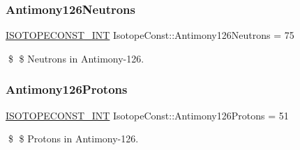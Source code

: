 \subsubsection{\texorpdfstring{Antimony126\+Neutrons}{Antimony126Neutrons}}
{\footnotesize\ttfamily \mbox{\hyperlink{group___isotope_const-_macros_ga5f18360b3e99483a35c32d789e62621c}{I\+S\+O\+T\+O\+P\+E\+C\+O\+N\+S\+T\+\_\+\+I\+NT}} Isotope\+Const\+::\+Antimony126\+Neutrons = 75}

\$ \$ Neutrons in Antimony-\/126. \mbox{\label{group___isotope_const-_antimony-_sb126_gaa0b935f35826832d19cf68b9bb60d9fb}} 
\subsubsection{\texorpdfstring{Antimony126\+Protons}{Antimony126Protons}}
{\footnotesize\ttfamily \mbox{\hyperlink{group___isotope_const-_macros_ga5f18360b3e99483a35c32d789e62621c}{I\+S\+O\+T\+O\+P\+E\+C\+O\+N\+S\+T\+\_\+\+I\+NT}} Isotope\+Const\+::\+Antimony126\+Protons = 51}

\$ \$ Protons in Antimony-\/126. 